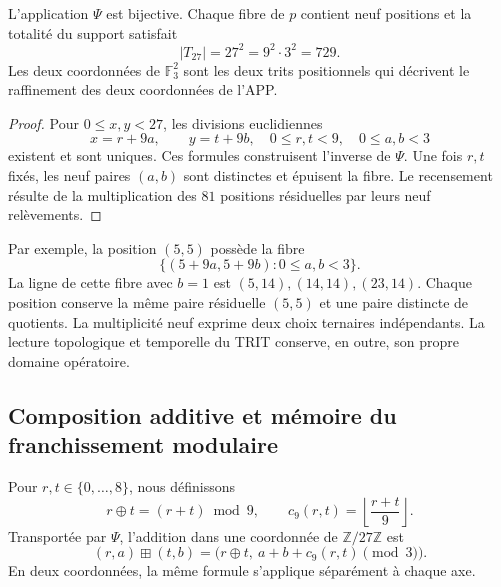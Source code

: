 \begin{proposition}
\label{prop:app-refinamiento-fibras}
L'application $\Psi$ est bijective. Chaque fibre de $p$ contient neuf
positions et la totalité du support satisfait
\[
 |T_{27}|=27^2=9^2\cdot3^2=729.
\]
Les deux coordonnées de $\mathbb F_3^2$ sont les deux trits positionnels
qui décrivent le raffinement des deux coordonnées de l'APP.
\end{proposition}
\begin{proof}
Pour $0\leq x,y<27$, les divisions euclidiennes
\[
 x=r+9a,\qquad y=t+9b,
 \quad 0\leq r,t<9,\quad0\leq a,b<3
\]
existent et sont uniques. Ces formules construisent l'inverse de $\Psi$.
Une fois $r,t$ fixés, les neuf paires $(a,b)$ sont distinctes et épuisent la
fibre. Le recensement résulte de la multiplication des $81$ positions résiduelles
par leurs neuf relèvements.
\end{proof}

Par exemple, la position $(5,5)$ possède la fibre
\[
 \{(5+9a,5+9b):0\leq a,b<3\}.
\]
La ligne de cette fibre avec $b=1$ est
$(5,14),(14,14),(23,14)$. Chaque position conserve la même paire résiduelle
$(5,5)$ et une paire distincte de quotients. La multiplicité neuf exprime
deux choix ternaires indépendants. La lecture topologique et
temporelle du TRIT conserve, en outre, son propre domaine opératoire.

\subsection{Composition additive et mémoire du franchissement modulaire}

Pour $r,t\in\{0,\ldots,8\}$, nous définissons
\[
 r\oplus t=(r+t)\bmod9,\qquad
 c_9(r,t)=\left\lfloor\frac{r+t}{9}\right\rfloor.
\]
Transportée par $\Psi$, l'addition dans une coordonnée de
$\mathbb Z/27\mathbb Z$ est
\begin{equation}
 (r,a)\boxplus(t,b)
   =\bigl(r\oplus t,\ a+b+c_9(r,t)\pmod3\bigr).
 \label{eq:app-refinamiento-adicion}
\end{equation}
En deux coordonnées, la même formule s'applique séparément à chaque axe.

